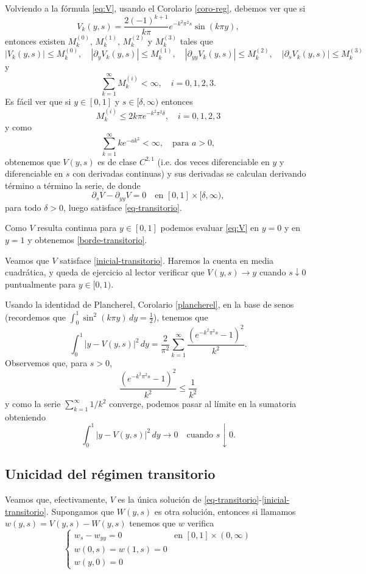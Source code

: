 \documentclass[12pt, a4paper]{amsbook}
\theoremstyle{remark}
\theoremstyle{definition}
\numberwithin{section}{chapter}
\numberwithin{subsection}{section}
\numberwithin{equation}{section}
\numberwithin{figure}{chapter}
\begin{document}
Volviendo a la fórmula \eqref{eq:V}, usando el Corolario \ref{coro-reg}, debemos ver que si 
$$
V_k(y, s) = \frac{2(-1)^{k+1}}{k\pi} e^{-k^2\pi^2 s}\sin(k\pi y),
$$
entonces existen $M_k^{(0)}$, $M_k^{(1)}$, $M_k^{(2)}$ y $M_k^{(3)}$ tales que
$$
|V_k(y,s)|\le M_k^{(0)},\quad |\partial_y V_k(y,s)|\le M_k^{(1)},\quad |\partial_{yy} V_k(y,s)|\le M_k^{(2)},\quad |\partial_s V_k(y,s)|\le M_k^{(3)}
$$
y
$$
\sum_{k=1}^\infty M_k^{(i)}<\infty,\quad i=0,1,2,3.
$$
Es fácil ver que si $y\in [0,1]$ y $s\in [\delta, \infty)$ entonces
$$
M_k^{(i)}\le 2k\pi e^{-k^2\pi^2\delta},\quad i=0,1,2,3
$$
y como
$$
\sum_{k=1}^\infty ke^{-ak^2} < \infty, \quad \text{para } a>0,
$$
obtenemos que $V(y, s)$ es de clase $C^{2,1}$ (i.e. dos veces diferenciable en $y$ y diferenciable en $s$ con derivadas continuas) y sus derivadas se calculan derivando término a término la serie, de donde
$$
\partial_s V - \partial_{yy} V = 0 \quad \text{en } [0,1]\times [\delta, \infty),
$$
para todo $\delta>0$, luego satisface \eqref{eq-transitorio}.

Como $V$ resulta continua para $y\in [0,1]$ podemos evaluar \eqref{eq:V} en $y=0$ y en $y=1$ y obtenemos \eqref{borde-transitorio}.

Veamos que $V$ satisface \eqref{inicial-transitorio}. Haremos la cuenta en media cuadrática, y queda de ejercicio al lector verificar que $V(y,s)\to y$ cuando $s\downarrow 0$ puntualmente para $y\in [0, 1)$.

Usando la identidad de Plancherel, Corolario \ref{plancherel}, en la base de senos (recordemos que $\int_0^1\sin^2(k\pi y)\,dy=\tfrac12$), tenemos que
$$
\int_0^1 |y - V(y,s)|^2\, dy = \frac{2}{\pi^2} \sum_{k=1}^\infty \frac{\left(e^{-k^2\pi^2 s} - 1\right)^2}{k^2}.
$$
Observemos que, para $s>0$, 
$$
\frac{\left(e^{-k^2\pi^2 s} - 1\right)^2}{k^2}\le \frac{1}{k^2}
$$
y como la serie $\sum_{k=1}^\infty 1/k^2$ converge, podemos pasar al límite en la sumatoria obteniendo
$$
\int_0^1 |y - V(y,s)|^2\, dy\to 0 \quad \text{cuando }s\downarrow 0.
$$

\subsection*{Unicidad del régimen transitorio}
Veamos que, efectivamente, $V$ es la única solución de \eqref{eq-transitorio}-\eqref{inicial-transitorio}. Supongamos que $W(y,s)$ es otra solución, entonces si llamamos $w(y, s) = V(y, s) - W(y, s)$ tenemos que $w$ verifica
$$
\begin{cases}
w_s - w_{yy} = 0 & \text{en } [0,1]\times (0,\infty)\\
w(0,s) = w(1,s)=0\\
w(y, 0)=0
\end{cases}
$$
\end{document}
